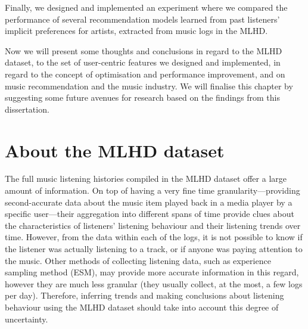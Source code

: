 Finally, we designed and implemented an experiment where we compared the performance of several recommendation models learned from past listeners' implicit preferences for artists, extracted from music logs in the MLHD.

Now we will present some thoughts and conclusions in regard to the MLHD dataset, to the set of user-centric features we designed and implemented, in regard to the concept of optimisation and performance improvement, and on music recommendation and the music industry.
We will finalise this chapter by suggesting some future avenues for research based on the findings from this dissertation.





\section{About the MLHD dataset}\label{sec:conc_mlhd}
The full music listening histories compiled in the MLHD dataset offer a large amount of information. On top of having a very fine time granularity---providing second-accurate data about the music item played back in a media player by a specific user---their aggregation into different spans of time provide clues about the characteristics of listeners' listening behaviour and their listening trends over time.
However, from the data within each of the logs, it is not possible to know if the listener was actually listening to a track, or if anyone was paying attention to the music. 
Other methods of collecting listening data, such as experience sampling method (ESM), may provide more accurate information in this regard, however they are much less granular (they usually collect, at the most, a few logs per day).
Therefore, inferring trends and making conclusions about listening behaviour using the MLHD dataset should take into account this degree of uncertainty. 

